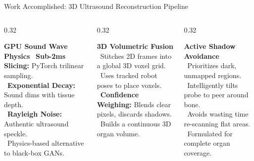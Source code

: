 \documentclass[aspectratio=169, 10pt]{beamer}
\begin{document}
\begin{frame}{Work Accomplished: 3D Ultrasound Reconstruction Pipeline}
    \vspace{0.2cm}
    \begin{columns}[T]
        \begin{column}{0.32\textwidth}
            \begin{block}{\centering \textbf{GPU Sound Wave Physics}}
                \footnotesize
                \textbullet\ \textbf{Sub-2ms Slicing:} PyTorch trilinear sampling.\\
                \textbullet\ \textbf{Exponential Decay:} Sound dims with tissue depth.\\
                \textbullet\ \textbf{Rayleigh Noise:} Authentic ultrasound speckle.\\
                \textbullet\ Physics-based alternative to black-box GANs.
            \end{block}
        \end{column}
        \begin{column}{0.32\textwidth}
            \begin{block}{\centering \textbf{3D Volumetric Fusion}}
                \footnotesize
                \textbullet\ Stitches 2D frames into a global 3D voxel grid.\\
                \textbullet\ Uses tracked robot poses to place voxels.\\
                \textbullet\ \textbf{Confidence Weighing:} Blends clear pixels, discards shadows.\\
                \textbullet\ Builds a continuous 3D organ volume.
            \end{block}
        \end{column}
        \begin{column}{0.32\textwidth}
            \begin{block}{\centering \textbf{Active Shadow Avoidance}}
                \footnotesize
                \textbullet\ Prioritizes dark, unmapped regions.\\
                \textbullet\ Intelligently tilts probe to peer around bone.\\
                \textbullet\ Avoids wasting time re-scanning flat areas.\\
                \textbullet\ Formulated for complete organ coverage.
            \end{block}
        \end{column}
    \end{columns}
\end{frame}
\end{document}
